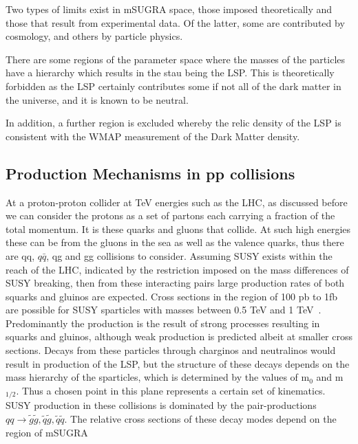 Two types of limits exist in mSUGRA space, those imposed theoretically and those that result from experimental data. Of the latter, some are contributed by cosmology, and others by particle physics. 

There are some regions of the parameter space where the masses of the particles have a hierarchy which results in the stau being the LSP. This is theoretically forbidden as the LSP certainly contributes some if not all of the dark matter in the universe, and it is known to be neutral. 

In addition, a further region is excluded whereby the relic density of the LSP is consistent with the WMAP measurement of the Dark Matter density. 

\subsection{Production Mechanisms in pp collisions}
At a proton-proton collider at TeV energies such as the LHC, as discussed before we can consider the protons as a set of partons each carrying a fraction of the total momentum. It is these quarks and gluons that collide. At such high energies these can be from the gluons in the sea as well as the valence quarks, thus there are qq, $q\bar{q}$, qg and gg collisions to consider.
Assuming SUSY exists within the reach of the LHC, indicated by the restriction imposed on the mass differences of SUSY breaking, then from these interacting pairs large production rates of both squarks and gluinos are expected. Cross sections in the region of 100 pb to 1fb are possible for SUSY sparticles with masses between 0.5 TeV and 1 TeV~\cite{early}. Predominantly the production is the result of strong processes resulting in squarks and gluinos, although weak production is predicted albeit at smaller cross sections. Decays from these particles through charginos and neutralinos would result in production of the LSP, but the structure of these decays depends on the mass hierarchy of the sparticles, which is determined by the values of m$_{0}$ and m$_{1/2}$.  Thus a chosen point in this plane represents a certain set of kinematics. SUSY production in these collisions is dominated by the pair-productions $ qq \rightarrow \tilde{g} \tilde{g}, \tilde{q}\tilde{g}, \tilde{q} \tilde{q}$. The relative cross sections of these decay modes depend on the region of mSUGRA 

